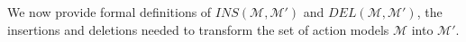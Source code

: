 We now provide formal definitions of $INS(\mathcal{M},\mathcal{M'})$ and $DEL(\mathcal{M},\mathcal{M'})$, the insertions and deletions needed to transform the set of action models $\mathcal{M}$ into $\mathcal{M'}$.




